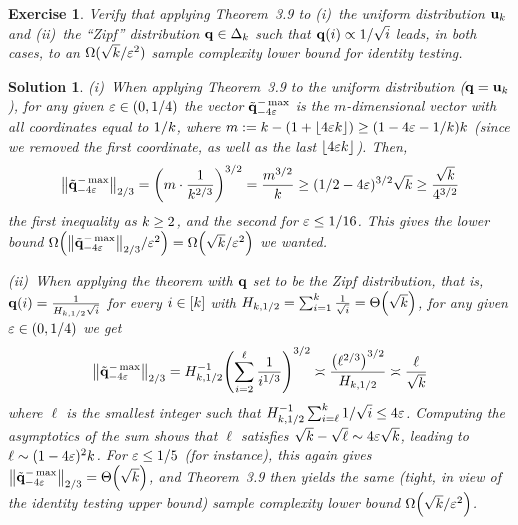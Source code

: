 \documentclass[biber,plain]{nowfnt} %
\newtheorem{question}{Exercise}[chapter]
\newtheorem{solution}{Solution}[chapter]
\begin{document}
\begin{question}\label{ex:2/3:lb:applications}
Verify that applying Theorem~3.9 to (i)~the uniform distribution $\mathbf{u}_k$ and (ii)~the ``Zipf'' distribution $\mathbf{q}\in\Delta_{k}$ such that $\mathbf{q}(i) \propto 1/\sqrt{i}$ leads, in both cases, to an $\Omega(\sqrt{k}/\varepsilon^2)$ sample complexity lower bound for identity testing.
\end{question}
\begin{solution}
(i)~When applying Theorem~3.9 to the uniform distribution (\ie $\mathbf{q}=\mathbf{u}_{ k } $), for any given $\varepsilon \in (0,1/4)$ the vector $\tilde{\mathbf{q}}^{-\max}_{-4\varepsilon}$ is the $m$-dimensional vector with all coordinates equal to $1/k$, where $m \eqdef \ab-(1+\flr{4\dst\ab}) \geq (1-4\dst-1/\ab)\ab$ (since we removed the first coordinate, as well as the last $\flr{4\dst\ab}$). Then,
\[
	\norm{\tilde{\q}^{-\max}_{-4\dst}}_{2/3} = \Paren{m \cdot \frac{1}{\ab^{2/3}}}^{3/2} = \frac{m^{3/2}}{\ab}
	\geq (1/2-4\dst)^{3/2} \sqrt{\ab} \geq \frac{\sqrt{\ab}}{4^{3/2}}
\]
the first inequality as $k \geq 2$, and the second for $\varepsilon \leq 1/16$. This gives the lower bound $\bigOmega{\norm{\tilde{\q}^{-\max}_{-4\dst}}_{2/3}/\dst^2} = \bigOmega{\sqrt{\ab}/\dst^2}$ we wanted.\medskip

(ii)~When applying the theorem with $\mathbf{q}$ set to be the Zipf distribution, that is, $\mathbf{q}(i) = \frac{1}{H_{k, 1/2}\sqrt{i}}$ for every $i\in [k]$ with $H_{\ab, 1/2}  = \sum_{i=1}^\ab \frac{1}{\sqrt{i}} = \bigTheta{\sqrt{\ab}}$, for any given $\varepsilon\in(0,1/4)$ we get
\[
	\norm{\tilde{\q}^{-\max}_{-4\dst}}_{2/3}
	= H_{\ab, 1/2}^{-1}  \Paren{ \sum_{i=2}^{\ell} \frac{1}{i^{1/3}} }^{3/2} \asymp \frac{\Paren{ \ell^{2/3} }^{3/2}}{H_{\ab, 1/2}}
	\asymp \frac{\ell}{\sqrt{\ab}}
\]
where $\ell$ is the smallest integer such that $H_{k, 1/2}^{-1}\sum_{i=\ell}^k 1/\sqrt{i} \leq 4\varepsilon$. Computing the asymptotics of the sum shows that $\ell$ satisfies $\sqrt{k}-\sqrt{\ell} \sim 4\varepsilon\sqrt{k}$, leading to $\ell \sim (1-4\varepsilon)^2 k$. For $\varepsilon \leq 1/5$ (for instance), this again gives $\norm{\tilde{\q}^{-\max}_{-4\dst}}_{2/3} = \bigTheta{\sqrt{\ab}}$, and Theorem~3.9 then yields the same (tight, in view of the identity testing upper bound) sample complexity lower bound $\bigOmega{\sqrt{\ab}/\dst^2}$.
\end{solution}
\end{document}
